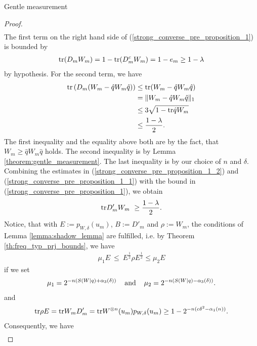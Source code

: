 \begin{subsubsection}{Gentle measurement}
\begin{proof}
\begin{align}
	 \end{align}
         The first term on the right hand side of (\ref{strong_converse_pre_proposition_1}) is bounded by
         \begin{align}
          \mathrm{tr}(D_m W_m) = 1 - \mathrm{tr}(D_m^c W_m) = 1 - e_m \geq 1 -\lambda \label{strong_converse_pre_proposition_1_1}
         \end{align}
	 by hypothesis. For the second term, we have
	 \begin{align}
	  \mathrm{tr}\left(D_m(W_m - \hat{q} W_m \hat{q})\right) 
	  & \leq \mathrm{tr} (W_m - \hat{q} W_m \hat{q}) \\
	  & = \|W_m - \hat{q} W_m \hat{q}\|_1 \\ 
	  &\leq 3 \sqrt{1 - \mathrm{tr} \hat{q} W_m} \\
	  &\leq \frac{1-\lambda}{2}. \label{strong_converse_pre_proposition_1_2}
	 \end{align}
	 The first inequality and the equality above both are by the fact, that $W_m \geq  \hat{q} W_m \hat{q}$ holds. The second inequality is by Lemma \ref{theorem:gentle_measurement}.
	 The last inequality is by our choice of $n$ and $\delta$. Combining the estimates in (\ref{strong_converse_pre_proposition_1_2}) and (\ref{strong_converse_pre_proposition_1_1}) 
	 with the bound in (\ref{strong_converse_pre_proposition_1}), we obtain
	 \begin{align}
	  \mathrm{tr} D'_m W_m \ \geq \frac{1-\lambda}{2}.
	 \end{align}
         Notice, that with $E := p_{W,\delta}(u_m)$, $B := D'_m$ and $\rho := W_m$, the conditions of Lemma \ref{lemma:shadow_lemma} are fulfilled, i.e. by Theorem \ref{th:freq_typ_prj_bounds}, we 
         have
         \begin{align}
          \mu_1 E \ \leq \ E^{\tfrac{1}{2}} \rho E^{\tfrac{1}{2}} \leq \mu_2 E 
         \end{align}
         if we set 
         \begin{align}
          \mu_1 = 2^{-n(S(W|q) + \alpha_3(\delta))} \hspace{.4cm} \text{and} \hspace{.4cm} \mu_2 = 2^{-n(S(W|q) - \alpha_3(\delta))}.
         \end{align}
	 and
	 \begin{align}
	  \mathrm{tr} \rho E = \mathrm{tr} W_m D'_m = \mathrm{tr} W^{\otimes n}(u_m)p_{W,\delta}(u_m) \geq 1 - 2^{-n(c\delta^2 - \alpha_1(n))}.
	 \end{align}
         Consequently, we have
         \begin{align}

\end{align}
\end{proof}
\end{subsubsection}
